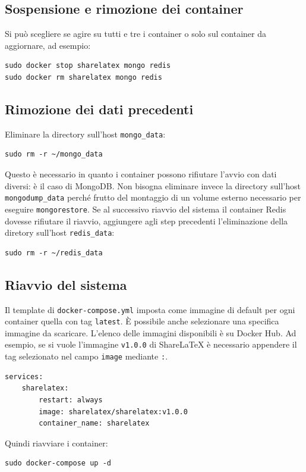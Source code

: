 \subsection{Sospensione e rimozione dei container}
Si può scegliere se agire su tutti e tre i container o solo sul container da aggiornare, ad esempio:
\begin{lstlisting}
sudo docker stop sharelatex mongo redis
sudo docker rm sharelatex mongo redis
\end{lstlisting}

\subsection{Rimozione dei dati precedenti}
Eliminare la directory sull'host \verb|mongo_data|:
\begin{lstlisting}
sudo rm -r ~/mongo_data
\end{lstlisting}
Questo è necessario in quanto i container possono rifiutare l'avvio con dati diversi: è il caso di MongoDB. Non bisogna eliminare invece la directory sull'host \verb|mongodump_data| perché frutto del montaggio di un volume esterno necessario per eseguire \verb|mongorestore|. Se al successivo riavvio del sistema il container Redis dovesse rifiutare il riavvio, aggiungere agli step precedenti l'eliminazione della diretory sull'host \verb|redis_data|:
\begin{lstlisting}
sudo rm -r ~/redis_data
\end{lstlisting}

\subsection{Riavvio del sistema}
Il template di \verb|docker-compose.yml| imposta come immagine di default per ogni container quella con tag \verb|latest|. È possibile anche selezionare una specifica immagine da scaricare. L'elenco delle immagini disponibili è su Docker Hub. Ad esempio, se si vuole l'immagine \verb|v1.0.0| di ShareLaTeX è necessario appendere il tag selezionato nel campo \verb|image| mediante \verb|:|.
\begin{lstlisting}
services:
    sharelatex:
        restart: always
        image: sharelatex/sharelatex:v1.0.0
        container_name: sharelatex
\end{lstlisting}
Quindi riavviare i container:
\begin{lstlisting}
sudo docker-compose up -d
\end{lstlisting}

